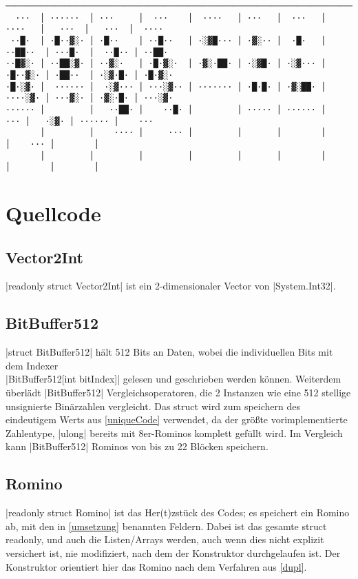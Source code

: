 \documentclass[a4paper,10pt,ngerman]{scrartcl}
\begin{document}
\begin{lstlisting}
──────────────────────────────────────────────────────────────────────────────────────────────────────────────────
  ···  │ ······  │ ···     │  ···    │  ····   │ ···   │  ···   │  ····   │   ···  │   ···  │  ····
 ··█·  │ ·█··▓░· │ ·█··    │ ··█··   │ ·░▓█··· │ ·▓░·· │  ·█·   │ ··██··  │ ···█·  │  ··█·· │ ··██·
··█▓░· │ ··██░▓· │ ··▓░·   │ ·█·▓░·  │ ·▓░·██· │ ·░▓█· │ ·░▓··· │ ·█··▓░· │ ·██··  │ ·░▓·█· │ ·█·▓░·
·█·░▓· │  ······ │  ·░▓··· │ ···░▓·· │ ······· │ ·█·█· │ ·▓░██· │ ····░▓· │ ···▓░· │ ·▓░·█· │ ···░▓·
······ │         │   ··██· │    ··█· │         │ ····· │ ······ │     ··· │   ·░▓· │ ······ │    ···
       │         │    ···· │     ··· │         │       │        │         │    ··· │        │
       │         │         │         │         │       │        │         │        │        │
\end{lstlisting}

\section{Quellcode}

\subsection{Vector2Int}

|readonly struct Vector2Int| ist ein 2-dimensionaler Vector von
|System.Int32|.

\subsection{BitBuffer512}

|struct BitBuffer512| hält 512 Bits an Daten,
wobei die individuellen Bits mit dem Indexer\\
|BitBuffer512[int bitIndex]| gelesen und geschrieben
werden können. Weiterdem überlädt |BitBuffer512|
Vergleichsoperatoren, die 2 Instanzen wie eine 512 stellige
unsignierte Binärzahlen vergleicht.
Das struct wird zum speichern des eindeutigem Werts aus
\cref{uniqueCode} verwendet, da der größte vorimplementierte
Zahlentype, |ulong| bereits mit 8er-Rominos komplett
gefüllt wird. Im Vergleich kann |BitBuffer512|
Rominos von bis zu 22 Blöcken speichern.

\subsection{Romino}

|readonly struct Romino| ist das Her(t)zstück des Codes; es speichert ein Romino ab,
mit den in \cref{umsetzung} benannten Feldern. Dabei ist das gesamte struct
readonly, und auch die Listen/Arrays werden, auch wenn dies nicht explizit
versichert ist, nie modifiziert, nach dem der Konstruktor durchgelaufen ist.
Der Konstruktor orientiert hier das Romino nach dem Verfahren aus \cref{dupl}.
\end{document}
